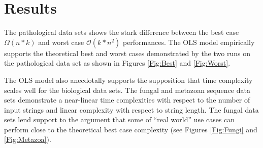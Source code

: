 \documentclass{bmcart}
\begin{document}
\section*{Results}

The pathological data sets shows the stark difference between the best case $\Omega(n * k)$ and worst case $\mathcal{O}(k * n^2)$ performances.
The OLS model empirically supports the theoretical best and worst cases demonstrated by the two runs on the pathological data set as shown in Figures \ref{Fig:Best} and \ref{Fig:Worst}.

The OLS model also anecdotally supports the supposition that time complexity scales well for the biological data sets.
The fungal and metazoan sequence data sets demonstrate a near-linear time complexities with respect to the number of input strings and linear complexity with respect to string length.
The fungal data sets lend support to the argument that some of ``real world'' use cases can perform close to the theoretical best case complexity (see Figures \ref{Fig:Fungi} and \ref{Fig:Metazoa}).


\end{document}
